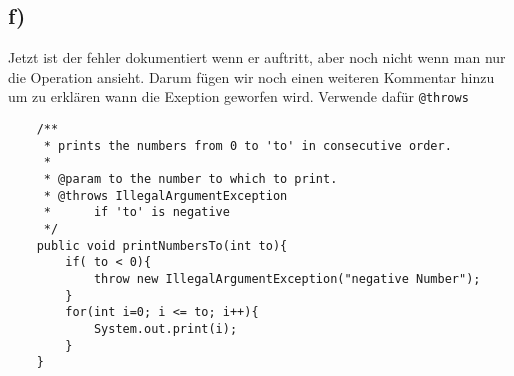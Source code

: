 \subsection*{f)}
	Jetzt ist der fehler dokumentiert wenn er auftritt, aber noch nicht wenn man nur die Operation ansieht. Darum fügen wir noch einen weiteren Kommentar hinzu um zu erklären wann die Exeption geworfen wird. Verwende dafür  \lstinline{@throws}
		 \begin{lstlisting}
	/**
	 * prints the numbers from 0 to 'to' in consecutive order.
	 * 
	 * @param to the number to which to print.
	 * @throws IllegalArgumentException
	 * 		if 'to' is negative
	 */
	public void printNumbersTo(int to){
		if( to < 0){
			throw new IllegalArgumentException("negative Number");	
		}
		for(int i=0; i <= to; i++){
			System.out.print(i);
		}
	}
		\end{lstlisting}
 \
